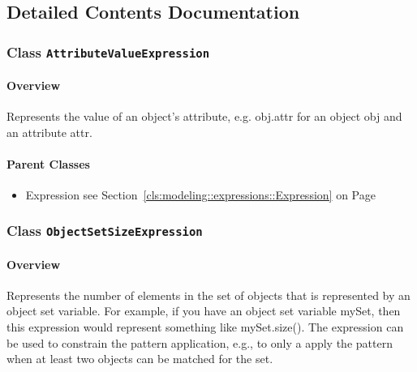 		



\subsection{Detailed Contents Documentation}
\subsubsection{\Large{Class \bfseries \texttt{AttributeValueExpression}\normalfont}}
\label{cls:modeling::patterns::expressions::AttributeValueExpression} 
\paragraph{Overview}

	
			
Represents the value of an object's attribute, e.g. obj.attr for an object obj and an attribute attr.	
		
	



\paragraph{Parent Classes}
\begin{itemize}
\item Expression see Section~\ref{cls:modeling::expressions::Expression} on Page~\pageref{cls:modeling::expressions::Expression}\end{itemize}
\subsubsection{\Large{Class \bfseries \texttt{ObjectSetSizeExpression}\normalfont}}
\label{cls:modeling::patterns::expressions::ObjectSetSizeExpression} 
\paragraph{Overview}

	
			
Represents the number of elements in the set of objects that is represented by an object set variable. For example, if you have an object set variable mySet, then this expression would represent something like mySet.size(). The expression can be used to constrain the pattern application, e.g., to only a apply the pattern when at least two objects can be matched for the set.	
		
